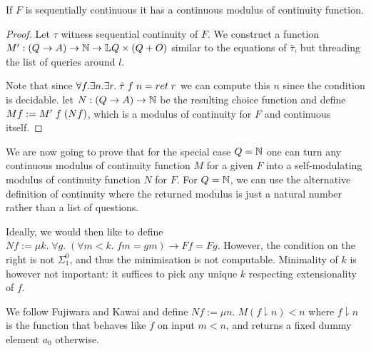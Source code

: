 \documentclass[a4paper,UKenglish,cleveref, autoref, thm-restate]{lipics-v2021}
\begin{document}
\begin{lemma}
  If $F$ is sequentially continuous it has a continuous modulus of continuity function.
\end{lemma}
\begin{proof}
  Let $\tau$ witness sequential continuity of $F$.
  We construct a function $M' : (Q \to A) \to \mathbb{N} \to \mathbb{L} Q \times (Q + O)$ similar to the equations of $\hat \tau$, but threading the list of queries around $l$.
  Note that since
  $\forall \f.\exists n.\exists r.\;\hat\tau\;\f\;n = \return r$
  we can compute this $n$ since the condition is decidable.
  let $N : (Q \to A) \to \mathbb{N}$ be the resulting choice function
  and define
  $M f := M'\;f\;(N f)$,
  which is a modulus of continuity for $F$ and continuous itself.
\end{proof}

We are now going to prove that for the special case $Q = \mathbb{N}$ one can turn
any continuous modulus of continuity function $M$ for a given $F$ into a self-modulating
modulus of continuity function $N$ for $F$.
For $Q = \mathbb{N}$, we can use the alternative definition of continuity where the returned modulus is just a natural number rather than a list of questions.

Ideally, we would then like to define $N f := \mu k.\;\forall g.\;(\forall m < k.\;f m = g m) \to F f = F g$.
However, the condition on the right is not $\Sigma^0_1$, and thus the minimisation is not computable.
Minimality of $k$ is however not important:
it suffices to pick any unique $k$ respecting extensionality of $f$.

We follow Fujiwara and Kawai and define $N f := \mu n.\;M (f \downharpoonright n) < n$
where $f \downharpoonright n$ is the function that behaves like $f$ on input $m < n$, and returns a fixed dummy element $a_0$ otherwise.
\end{document}
